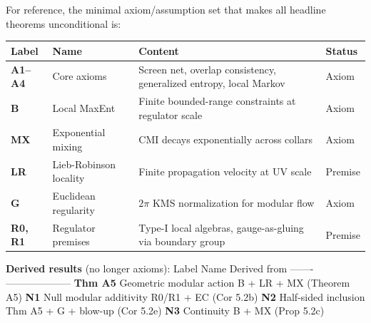 \documentclass[11pt,a4paper]{article}
\theoremstyle{remark}
\begin{document}
For reference, the minimal axiom/assumption set that makes all headline theorems
unconditional is:

{\def\LTcaptype{none} %
\begin{longtable}[]{@{}
  >{\raggedright\arraybackslash}p{}
  >{\raggedright\arraybackslash}p{}
  >{\raggedright\arraybackslash}p{}
  >{\raggedright\arraybackslash}p{}@{}}
\toprule\noalign{}
\begin{minipage}[b]{\linewidth}\raggedright
Label
\end{minipage} & \begin{minipage}[b]{\linewidth}\raggedright
Name
\end{minipage} & \begin{minipage}[b]{\linewidth}\raggedright
Content
\end{minipage} & \begin{minipage}[b]{\linewidth}\raggedright
Status
\end{minipage} \\
\midrule\noalign{}
\endhead
\bottomrule\noalign{}
\endlastfoot
\textbf{A1--A4} & Core axioms & Screen net, overlap consistency, generalized entropy, local Markov & Axiom \\
\textbf{B} & Local MaxEnt & Finite bounded-range constraints at regulator scale & Axiom \\
\textbf{MX} & Exponential mixing & CMI decays exponentially across collars & Axiom \\
\textbf{LR} & Lieb-Robinson locality & Finite propagation velocity at UV scale & Premise \\
\textbf{G} & Euclidean regularity & \(2\pi\) KMS normalization for modular flow & Axiom \\
\textbf{R0, R1} & Regulator premises & Type-I local algebras, gauge-as-gluing via boundary group & Premise \\
\end{longtable}
}

\textbf{Derived results} (no longer axioms):
\textbar{} Label \textbar{} Name \textbar{} Derived from \textbar{}
\textbar-------\textbar------\textbar--------------\textbar{}
\textbar{} \textbf{Thm A5} \textbar{} Geometric modular action \textbar{} B + LR + MX (Theorem A5) \textbar{}
\textbar{} \textbf{N1} \textbar{} Null modular additivity \textbar{} R0/R1 + EC (Cor 5.2b) \textbar{}
\textbar{} \textbf{N2} \textbar{} Half-sided inclusion \textbar{} Thm A5 + G + blow-up (Cor 5.2e) \textbar{}
\textbar{} \textbf{N3} \textbar{} Continuity \textbar{} B + MX (Prop 5.2c) \textbar{}
\end{document}
